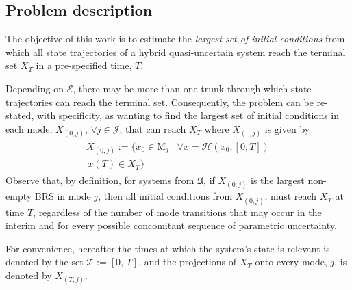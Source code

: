 \subsection{Problem description}
The objective of this work is to estimate the {\em largest set of initial conditions} from which all state trajectories of a hybrid quasi-uncertain system reach the terminal set $X_T$ in a pre-specified time, $T$.
\par
Depending on $\mathcal E$, there may be more than one trunk through which state trajectories can reach the terminal set. Consequently, the problem can be re-stated, with specificity, as wanting to find the largest set of initial conditions in each mode, $X_{(0,j)},\,\forall j\in \mathcal J$, that can reach $X_T$ where $X_{(0,j)}$ is given by
\begin{align}
\begin{aligned}
     X_{(0,j)}:=\{x_0\in \mathrm M_j\mid \forall x=\mathcal H(x_0,[0,T]) \\\,x(T)\in X_T\}
     \label{eq:brs}
\end{aligned}
\end{align}
Observe that, by definition, for systems from $\mathfrak{U}$, if $X_{(0,j)}$ is the largest non-empty BRS in mode $j$, then all initial conditions from $X_{(0,j)}$, must reach $X_T$ at time $T$, regardless of the number of mode transitions that may occur in the interim and for every possible concomitant sequence of parametric uncertainty.
\par
For convenience, hereafter the times at which the system's state is relevant is denoted by the set $\mathcal T:=[0,\,T]$, and the projections of $X_T$ onto every mode, $j$, is denoted by $X_{(T,j)}$.
